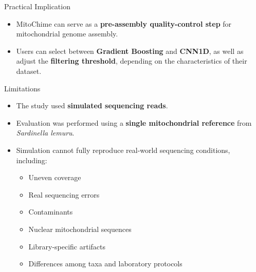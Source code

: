 \documentclass[aspectratio=169,11pt]{beamer}
\begin{document}

\begin{frame}{Practical Implication}

\vspace{0.55cm}

\begin{itemize}

    \setlength{\itemsep}{0.65cm}

    \item
    MitoChime can serve as a
    \textbf{pre-assembly quality-control step}
    for mitochondrial genome assembly.

    \item
    Users can select between
    \textbf{Gradient Boosting} and \textbf{CNN1D},
    as well as adjust the
    \textbf{filtering threshold},
    depending on the characteristics of their dataset.

\end{itemize}

\end{frame}


\begin{frame}{Limitations}

\vspace{0.35cm}

\begin{itemize}

    \setlength{\itemsep}{0.30cm}

    \item
    The study used \textbf{simulated sequencing reads}.

    \item
    Evaluation was performed using a
    \textbf{single mitochondrial reference} from
    \textit{Sardinella lemuru}.

    \item
    Simulation cannot fully reproduce real-world sequencing conditions,
    including:

    \begin{itemize}
        \setlength{\itemsep}{0.10cm}

        \item Uneven coverage
        \item Real sequencing errors
        \item Contaminants
        \item Nuclear mitochondrial sequences
        \item Library-specific artifacts
        \item Differences among taxa and laboratory protocols

    \end{itemize}

\end{itemize}

\end{frame}
\end{document}
